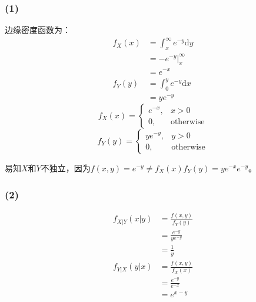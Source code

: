 \documentclass[a4paper,12pt]{ctexart}
\begin{document}
\subsubsection*{(1)}

边缘密度函数为：
\begin{align*}
	f_X(x) &= \int_x^{\infty} e^{-y} \mathrm{d}y \\
	&= -e^{-y} \bigg|_x^{\infty} \\
	&= e^{-x} \\
	f_Y(y) &= \int_0^y e^{-y} \mathrm{d}x \\
	&= ye^{-y}
\end{align*}
\begin{equation*}
	f_X(x) =
	\begin{cases}
		e^{-x}, & x > 0 \\
		0, & \text{otherwise}
	\end{cases}
\end{equation*}
\begin{equation*}
	f_Y(y) =
	\begin{cases}
		ye^{-y}, & y > 0 \\
		0, & \text{otherwise}
	\end{cases}
\end{equation*}

易知$X$和$Y$不独立，因为$f(x,y) = e^{-y} \neq f_X(x)f_Y(y) = ye^{-x}e^{-y}$。

\subsubsection*{(2)}

\begin{align*}
	f_{X|Y}(x|y) &= \frac{f(x,y)}{f_Y(y)} \\
	&= \frac{e^{-y}}{ye^{-y}} \\
	&= \frac{1}{y} \\
	f_{Y|X}(y|x) &= \frac{f(x,y)}{f_X(x)} \\
	&= \frac{e^{-y}}{e^{-x}} \\
	&= e^{x-y}
\end{align*}
\end{document}
